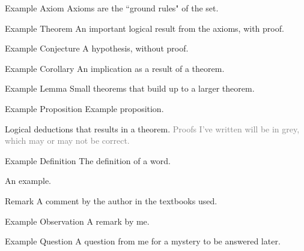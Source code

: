 \documentclass[12pt, english]{book}
\makeatletter
\renewenvironment{proof}[1][\proofname]{\par
	\pushQED{\qed}%
	\normalfont \topsep6\p@\@plus6\p@\relax
	\list{}{%
		\settowidth{\leftmargin}{\itshape\proofname:\hskip\labelsep}%
		\setlength{\labelwidth}{0pt}%
		\setlength{\itemindent}{-\leftmargin}%
	}%
	\item[\hskip\labelsep\itshape#1\@addpunct{:}]\ignorespaces
	}{ \popQED\endlist\@endpefalse}
\makeatother
\begin{document}
	\begin{axiom}{Example Axiom}
		Axioms are the ``ground rules" of the set.
	\end{axiom}

	\begin{theorem}{Example Theorem}
		An important logical result from the axioms, with proof.
	\end{theorem}

	\begin{conjecture}{Example Conjecture}
		A hypothesis, without proof.
	\end{conjecture}
	
	\begin{corollary}{Example Corollary}
		An implication as a result of a theorem.
	\end{corollary}

	\begin{lemma}{Example Lemma}
		Small theorems that build up to a larger theorem. 
	\end{lemma}
	
	\begin{proposition}{Example Proposition}
		Example proposition.
	\end{proposition}
	
	\begin{proof}
		Logical deductions that results in a theorem.
		\textcolor{Grey}{Proofs I've written will be in grey, which may or may not be correct.}
	\end{proof}

	\begin{definition}[Word]{Example Definition}
		The definition of a word.
	\end{definition}	

	\begin{example}
		An example.
	\end{example}

	\begin{remark}{Remark}
		A comment by the author in the textbooks used.
	\end{remark}
	
	\begin{observation}{Example Observation}
		A remark by me.
	\end{observation}

	\begin{question}{Example Question}
		A question from me for a mystery to be answered later. 
	\end{question}
\end{document}
